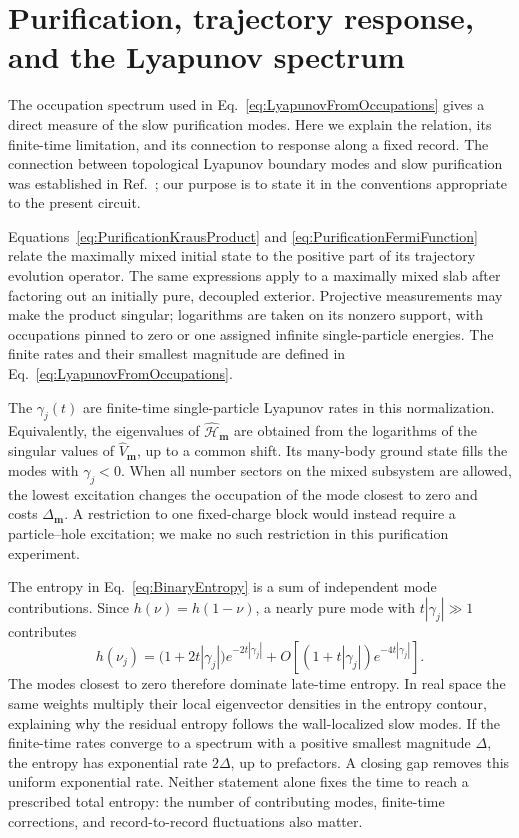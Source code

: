 \documentclass[aps,prb,10pt,twocolumn,superscriptaddress,longbibliography,floatfix]{revtex4-2}
\newcommand{\rec}{\mathbf m}   %
\begin{document}
{\color{blue}
\section{Purification, trajectory response, and the Lyapunov spectrum}
\label{app:Lyapunov}

The occupation spectrum used in Eq.~\eqref{eq:LyapunovFromOccupations} gives a direct measure of the slow purification modes. Here we explain the relation, its finite-time limitation, and its connection to response along a fixed record. The connection between topological Lyapunov boundary modes and slow purification was established in Ref.~\cite{XiaoKawabata2026}; our purpose is to state it in the conventions appropriate to the present circuit.

Equations~\eqref{eq:PurificationKrausProduct} and \eqref{eq:PurificationFermiFunction} relate the maximally mixed initial state to the positive part of its trajectory evolution operator. The same expressions apply to a maximally mixed slab after factoring out an initially pure, decoupled exterior. Projective measurements may make the product singular; logarithms are taken on its nonzero support, with occupations pinned to zero or one assigned infinite single-particle energies. The finite rates and their smallest magnitude are defined in Eq.~\eqref{eq:LyapunovFromOccupations}.

The $\gamma_j(t)$ are finite-time single-particle Lyapunov rates in this normalization. Equivalently, the eigenvalues of $\hat{\mathcal H}_{\rec}$ are obtained from the logarithms of the singular values of $\hat V_{\rec}$, up to a common shift. Its many-body ground state fills the modes with $\gamma_j<0$. When all number sectors on the mixed subsystem are allowed, the lowest excitation changes the occupation of the mode closest to zero and costs $\Delta_{\rec}$. A restriction to one fixed-charge block would instead require a particle--hole excitation; we make no such restriction in this purification experiment.

The entropy in Eq.~\eqref{eq:BinaryEntropy} is a sum of independent mode contributions. Since $h(\nu)=h(1-\nu)$, a nearly pure mode with $t|\gamma_j|\gg1$ contributes
\begin{equation}
    h(\nu_j)=
    \big(1+2t|\gamma_j|\big)e^{-2t|\gamma_j|}
    +O\!\left[(1+t|\gamma_j|)e^{-4t|\gamma_j|}\right].
    \label{eq:PurificationEntropyAsymptotic}
\end{equation}
The modes closest to zero therefore dominate late-time entropy. In real space the same weights multiply their local eigenvector densities in the entropy contour, explaining why the residual entropy follows the wall-localized slow modes. If the finite-time rates converge to a spectrum with a positive smallest magnitude $\Delta$, the entropy has exponential rate $2\Delta$, up to prefactors. A closing gap removes this uniform exponential rate. Neither statement alone fixes the time to reach a prescribed total entropy: the number of contributing modes, finite-time corrections, and record-to-record fluctuations also matter.

}
\end{document}
